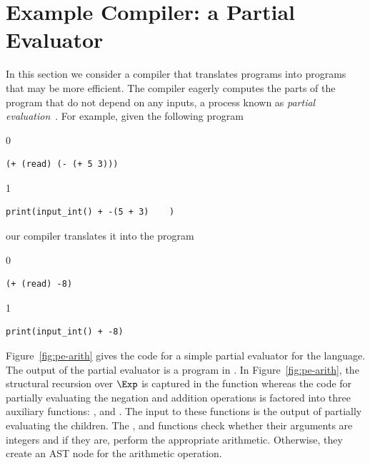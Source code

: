 \documentclass[7x10,nocrop]{TimesAPriori_MIT}%
\def\racketEd{0}
\def\pythonEd{1}
\def\edition{0}
\begin{document}
\section{Example Compiler: a Partial Evaluator}
\label{sec:partial-evaluation}

In this section we consider a compiler that translates \LangInt{}
programs into \LangInt{} programs that may be more efficient. The
compiler eagerly computes the parts of the program that do not depend
on any inputs, a process known as \emph{partial
evaluation}~\citep{Jones:1993uq}.  
For example, given the following program
{\if\edition\racketEd
\begin{lstlisting}
(+ (read) (- (+ 5 3)))
\end{lstlisting}
\fi}
{\if\edition\pythonEd
\begin{lstlisting}
print(input_int() + -(5 + 3)    )
\end{lstlisting}
\fi}
\noindent our compiler translates it into the program
{\if\edition\racketEd
\begin{lstlisting}
(+ (read) -8)
\end{lstlisting}
\fi}
{\if\edition\pythonEd
\begin{lstlisting}
print(input_int() + -8)
\end{lstlisting}
\fi}

Figure~\ref{fig:pe-arith} gives the code for a simple partial
evaluator for the \LangInt{} language. The output of the partial evaluator
is a program in \LangInt{}. In Figure~\ref{fig:pe-arith}, the structural
recursion over $\Exp$ is captured in the  function
whereas the code for partially evaluating the negation and addition
operations is factored into three auxiliary functions:
,  and . The input to these 
functions is the output of partially evaluating the children.
The ,  and  functions check whether their
arguments are integers and if they are, perform the appropriate
arithmetic. Otherwise, they create an AST node for the arithmetic
operation.
\end{document}
